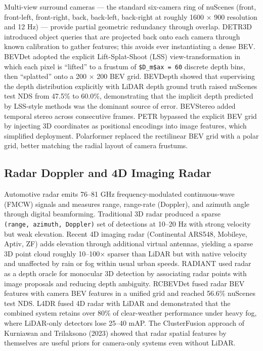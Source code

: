 \documentclass{article}
\begin{document}
Multi-view surround cameras --- the standard six-camera ring of nuScenes (front, front-left, front-right, back, back-left, back-right at roughly 1600 × 900 resolution and 12 Hz) --- provide partial geometric redundancy through overlap. DETR3D \citep{wang2022detr3d3dobjectdete} introduced object queries that are projected back onto each camera through known calibration to gather features; this avoids ever instantiating a dense BEV. BEVDet \citep{huang2021bevdethighperforma} adopted the explicit Lift-Splat-Shoot (LSS) view-transformation in which each pixel is ``lifted'' to a frustum of \texttt{\$D\_m\$ax\ =\ 60} discrete depth bins, then ``splatted'' onto a 200 × 200 BEV grid. BEVDepth \citep{li2023bevdepthacquisitio} showed that supervising the depth distribution explicitly with LiDAR depth ground truth raised nuScenes test NDS from 47.5\% to 60.0\%, demonstrating that the implicit depth predicted by LSS-style methods was the dominant source of error. BEVStereo \citep{li2023bevdepthacquisitio} added temporal stereo across consecutive frames. PETR \citep{liu2022petrpositionembedd} bypassed the explicit BEV grid by injecting 3D coordinates as positional encodings into image features, which simplified deployment. Polarformer \citep{jiang2023polarformermultica} replaced the rectilinear BEV grid with a polar grid, better matching the radial layout of camera frustums.

\subsection{Radar Doppler and 4D Imaging Radar}\label{radar-doppler-and-4d-imaging-radar}

Automotive radar emits 76--81 GHz frequency-modulated continuous-wave (FMCW) signals and measures range, range-rate (Doppler), and azimuth angle through digital beamforming. Traditional 3D radar produced a sparse \texttt{(range,\ azimuth,\ Doppler)} set of detections at 10--20 Hz with strong velocity but weak elevation. Recent 4D imaging radar (Continental ARS548, Mobileye, Aptiv, ZF) adds elevation through additional virtual antennas, yielding a sparse 3D point cloud roughly 10--100× sparser than LiDAR but with native velocity and unaffected by rain or fog within usual urban speeds. RADIANT \citep{long2023radiantradarimagea} used radar as a depth oracle for monocular 3D detection by associating radar points with image proposals and reducing depth ambiguity. RCBEVDet \citep{lin2024rcbevdetradarcamer} fused radar BEV features with camera BEV features in a unified grid and reached 56.6\% nuScenes test NDS. L4DR \citep{huang2024l4drlidar4dradarfu} fused 4D radar with LiDAR and demonstrated that the combined system retains over 80\% of clear-weather performance under heavy fog, where LiDAR-only detectors lose 25--40 mAP. The ClusterFusion approach of Kurniawan and Trilaksono (2023) showed that radar spatial features by themselves are useful priors for camera-only systems even without LiDAR.
\end{document}
